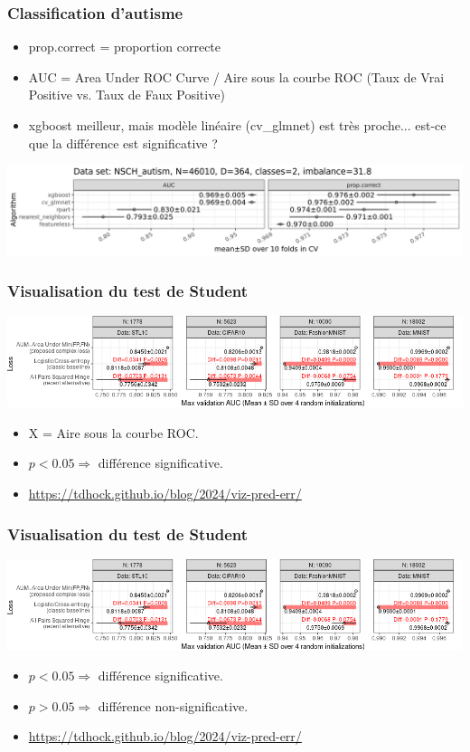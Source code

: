 \documentclass{beamer}
\begin{document}
\begin{frame}
  \frametitle{Classification d'autisme}
  \begin{itemize}
  \item prop.correct = proportion correcte
  \item AUC = Area Under ROC Curve / Aire sous la courbe ROC (Taux de Vrai Positive vs. Taux de Faux Positive)
  \item xgboost meilleur, mais modèle linéaire (cv\_glmnet) est très
    proche... est-ce que la différence est significative ?
  \end{itemize}
  \includegraphics[width=\textwidth]{../cv-evaluation-examples/NSCH_autism_error_algos_mean_SD.png}
\end{frame}

\begin{frame}
  \frametitle{Visualisation du test de Student}
  \includegraphics[width=2.9\textwidth]{p-others-1}
  \begin{itemize}
  \item X = Aire sous la courbe ROC.
  \item $p<0.05\Rightarrow$ différence significative.
  \item \tiny \url{https://tdhock.github.io/blog/2024/viz-pred-err/}
  \end{itemize}
\end{frame}

\begin{frame}
  \frametitle{Visualisation du test de Student}
  \includegraphics[width=\textwidth]{p-others-1}
  \begin{itemize}
  \item $p<0.05\Rightarrow$ différence significative.
  \item $p>0.05\Rightarrow$ différence non-significative.
  \item \tiny \url{https://tdhock.github.io/blog/2024/viz-pred-err/}
  \end{itemize}
\end{frame}
\end{document}

